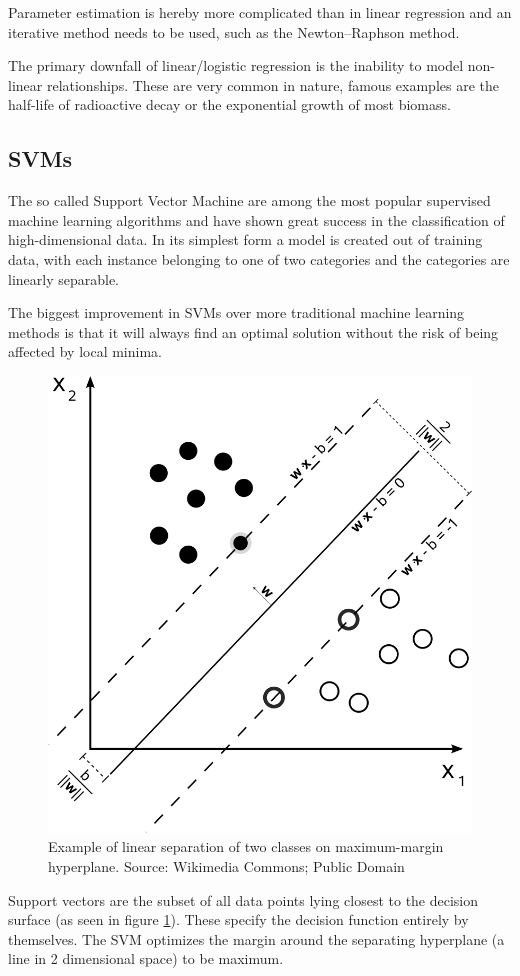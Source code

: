 Parameter estimation is hereby more complicated than in linear regression and an iterative method needs to be used, such as the Newton–Raphson method.


The primary downfall of linear/logistic regression is the inability to model non-linear relationships. These are very common in nature, famous examples are the half-life of radioactive decay or the exponential growth of most biomass.


\subsection{SVMs}



The so called Support Vector Machine are among the most popular supervised machine learning algorithms and have shown great success in the classification of high-dimensional data. In its simplest form a model is created out of training data, with each instance belonging to one of two categories and the categories are linearly separable.

The biggest improvement in SVMs over more traditional machine learning methods is that it will always find an optimal solution without the risk of being affected by local minima.

\begin{figure}[h]
    \centering
	\includegraphics[width=.6\textwidth]{./images/illustrations/svm}
    \caption{Example of linear separation of two classes on maximum-margin hyperplane. Source: Wikimedia Commons; Public Domain}
    \label{fig:svm}
\end{figure}


Support vectors are the subset of all data points lying closest to the decision surface (as seen in figure \ref{fig:svm}). These specify the decision function entirely by themselves. The SVM optimizes the margin around the separating hyperplane (a line in 2 dimensional space) to be maximum.


